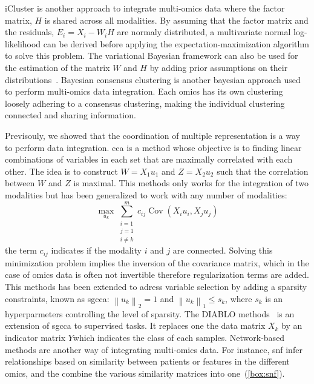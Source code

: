 \documentclass[../main.tex]{subfiles}
\begin{document}
		iCluster is another approach to integrate multi-omics data where the factor matrix, \(H\) is shared across all modalities.
		By assuming that the factor matrix and the residuals, \(E_i = X_i - W_i H\) are normaly distributed, a multivariate normal log-likelihood can be derived before applying the expectation-maximization algorithm to solve this problem.
		The variational Bayesian framework can also be used for the estimation of the matrix \(W\) and \(H\) by adding prior assumptions on their distributions~\cite{MOFA}.
		Bayesian consensus clustering is another bayesian approach used to perform multi-omics data integration.
		Each omics has its own clustering loosely adhering to a consensus clustering, making the individual clustering connected and sharing information.

		Previsouly, we showed that the coordination of multiple representation is a way to perform data integration.
		\Gls{cca} is a method whose objective is to finding linear combinations of variables in each set that are maximally correlated with each other.
		The idea is to construct \(W=X_1u_1\) and \(Z=X_2u_2\) such that the correlation between \(W\) and \(Z\) is maximal.
		This methods only works for the integration of two modalities but has been generalized to work with any number of modalities:
		\begin{equation}
			\max_{u_k} \sum_{\substack{i=1 \\ j=1 \\ i\neq k}}^{m} c_{ij}\operatorname{Cov}\left(X_i u_i,X_j u_j\right)
		\end{equation}
		the term \(c_{ij}\) indicates if the modality \(i\) and \(j\) are connected.
		Solving this minimization problem implies the inversion of the covariance matrix, which in the case of omics data is often not invertible therefore regularization terms are added.
		This methods has been extended to adress variable selection by adding a sparsity constraints, known as \gls{sgcca}: \({\left\|u_k \right\|}_2 = 1\) and \({\left\|u_k \right\|}_1 \leq s_k\), where \(s_k\) is an hyperparmeters controlling the level of sparsity.
		The DIABLO methods~\cite{DIABLO} is an extension of \gls{sgcca} to supervised tasks.
		It replaces one the data matrix \(X_k\) by an indicator matrix \(Y\)which indicates the class of each samples.
		Network-based methods are another way of integrating multi-omics data.
		For instance, \gls{snf} infer relationships based on similarity between patients or features in the different omics, and the combine the various similarity matrices into one~(\cref{box:snf}).
\end{document}

